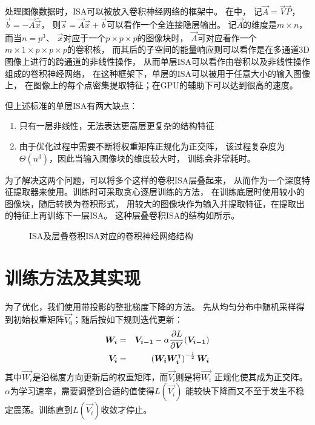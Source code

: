 处理图像数据时，ISA可以被放入卷积神经网络的框架中。
在中，
记$\vec{A} = \vec{V}\vec{P}$，$\vec{b}=-\vec{A}\bar{\vec{x}}$，
则$\vec{s}=\vec{A}\vec{x} + \vec{b}$可以看作一个全连接隐层输出。
记$\vec{A}$的维度是$m\times n$，而当$n=p^3$、
$\vec{x}$对应于一个$p\times p \times p$的图像块时，
$\vec{A}$可对应看作一个$m\times 1 \times p \times p \times p$的卷积核，
而其后的子空间的能量响应则可以看作是在多通道3D图像上进行的跨通道的非线性操作，
从而单层ISA可以看作由卷积以及非线性操作组成的卷积神经网络，
在这种框架下，单层的ISA可以被用于任意大小的输入图像上，
在图像上的每个点密集提取特征；在GPU的辅助下可以达到很高的速度。

但上述标准的单层ISA有两大缺点：
\begin{enumerate}
    \item 只有一层非线性，无法表达更高层更复杂的结构特征
    \item 由于优化过程中需要不断将权重矩阵正规化为正交阵，
        该过程复杂度为$\Theta(n^3)$，因此当输入图像块的维度较大时，
        训练会非常耗时。
\end{enumerate}

为了解决这两个问题，可以将多个这样的卷积ISA层叠起来，
从而作为一个深度特征提取器来使用。训练时可采取贪心逐层训练的方法，
在训练底层时使用较小的图像块，随后转换为卷积形式，
用较大的图像块作为输入并提取特征，在提取出的特征上再训练下一层ISA。
这种层叠卷积ISA的结构如所示。

\begin{figure}[H]
    \caption{ISA及层叠卷积ISA对应的卷积神经网络结构\cite{wu2013unsupervised}}
    \label{fig:isa:stack}
\end{figure}


\section{训练方法及其实现}
为了优化，我们使用带投影的整批梯度下降的方法。
先从均匀分布中随机采样得到初始权重矩阵$\vec{V_0}$；随后按如下规则迭代更新：
\begin{eqnarray}
    \boldsymbol{W_i} &=& \boldsymbol{V_{i-1}} - \alpha \frac{\partial L}{\partial
        \boldsymbol{V}}(\boldsymbol{V_{i-1}}) \nonumber  \\
        \boldsymbol{V_i} &=& \left(
            \boldsymbol{W_i}\boldsymbol{W_i}^\intercal\right)^{-\frac{1}{2}}\boldsymbol{W_i}
    \label{eqn:isa:train}
\end{eqnarray}
其中$\vec{W_i}$是沿梯度方向更新后的权重矩阵，而$\vec{V_i}$则是将$\vec{W_i}$
正规化使其成为正交阵。$\alpha$为学习速率，需要调整到合适的值使得$L(\vec{V_i})$
能较快下降而又不至于发生不稳定震荡。训练直到$L(\vec{V_i})$收敛才停止。

